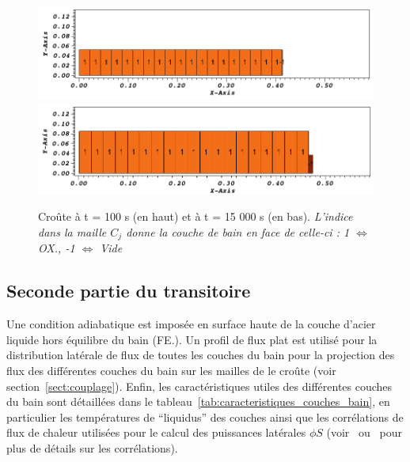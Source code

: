 \begin{figure}[H]
\centering
\includegraphics[width=\textwidth, keepaspectratio=true]{Figures/coriumCrust_100.png}\\
\includegraphics[width=\textwidth, keepaspectratio=true]{Figures/coriumCrust_15000.png}
\caption{Croûte à t = 100 s (en haut) et à t = 15 000 s (en bas). \textit{L'indice dans la maille $C_j$ donne la couche de bain en face de celle-ci : 1 $\Leftrightarrow$ OX., -1 $\Leftrightarrow$ Vide}}
\label{fig:croutes_1}
\end{figure}

\subsection{Seconde partie du transitoire}
\iffalse
Une condition adiabatique est imposée en surface haute de la couche d'acier liquide hors équilibre du bain (FE.). Un profil de flux plat est utilisé pour la distribution latérale de flux de toutes les couches du bain pour la projection des flux des différentes couches du bain sur les mailles de le croûte (voir section~\ref{sect:couplage}). Enfin, les caractéristiques utiles des différentes couches du bain sont détaillées dans le tableau~\ref{tab:caracteristiques_couches_bain}, en particulier les températures de ``liquidus'' des couches ainsi que les corrélations de flux de chaleur utilisées pour le calcul des puissances latérales $\phi S$ (voir~\cite{Bonnet1999} ou~\cite{Tourniaire2009a} pour plus de détails sur les corrélations).


